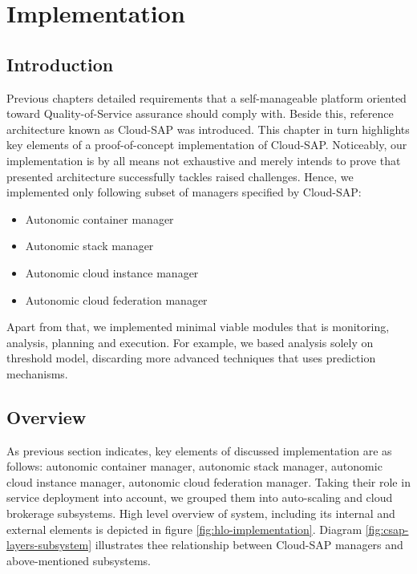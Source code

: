 \chapter{Implementation}


\section{Introduction}
Previous chapters detailed requirements that a self-manageable platform oriented toward Quality-of-Service assurance should comply with. Beside this, reference architecture known as Cloud-SAP was introduced. This chapter in turn highlights key elements of a proof-of-concept implementation of Cloud-SAP. Noticeably, our implementation is by all means not exhaustive and merely intends to prove that presented architecture successfully tackles raised challenges. Hence, we implemented only following subset of managers specified by Cloud-SAP:
\begin{itemize}
  \item Autonomic container manager
  \item Autonomic stack manager
  \item Autonomic cloud instance manager
  \item Autonomic cloud federation manager
\end{itemize}

Apart from that, we implemented minimal viable modules that is monitoring, analysis, planning and execution. For example, we based analysis solely on threshold model, discarding more advanced techniques that uses prediction mechanisms.

\section{Overview}
As previous section indicates, key elements of discussed implementation are as follows: autonomic container manager, autonomic stack manager, autonomic cloud instance manager, autonomic cloud federation manager. Taking their role in service deployment into account, we grouped them into auto-scaling and cloud brokerage subsystems. High level overview of system, including its internal and external elements is depicted in figure \ref{fig:hlo-implementation}. Diagram \ref{fig:csap-layers-subsystem} illustrates thee relationship between Cloud-SAP managers and above-mentioned subsystems. 

